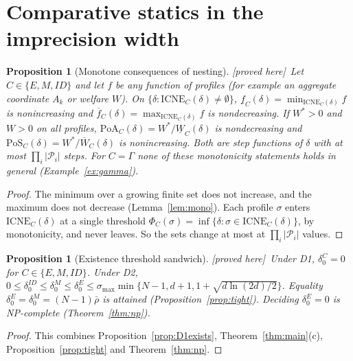 \documentclass[11pt]{article}
\newtheorem{proposition}[theorem]{Proposition}
\theoremstyle{definition}
\theoremstyle{remark}
\newcommand{\cP}{\mathcal{P}}
\newcommand{\ICNE}{\mathrm{ICNE}}
\newcommand{\PROVED}{\textsf{[proved here]}}
\begin{document}
\section{Comparative statics in the imprecision width}\label{sec:cs}

\begin{proposition}[Monotone consequences of nesting]\label{prop:cs} \PROVED\
Let $C\in\{E,M,ID\}$ and let $f$ be any function of profiles (for example an aggregate coordinate $A_k$ or welfare $W$). On $\{\delta:\ICNE_C(\delta)\ne\emptyset\}$, $\underline f_C(\delta)=\min_{\ICNE_C(\delta)}f$ is nonincreasing and $\overline f_C(\delta)=\max_{\ICNE_C(\delta)}f$ is nondecreasing. If $W^*>0$ and $W>0$ on all profiles, $\mathrm{PoA}_C(\delta)=W^*/\underline W_C(\delta)$ is nondecreasing and $\mathrm{PoS}_C(\delta)=W^*/\overline W_C(\delta)$ is nonincreasing. Both are step functions of $\delta$ with at most $\prod_i|\cP_i|$ steps. For $C=\Gamma$ none of these monotonicity statements holds in general (Example~\ref{ex:gamma}).
\end{proposition}
\begin{proof}
The minimum over a growing finite set does not increase, and the maximum does not decrease (Lemma~\ref{lem:mono}). Each profile $\sigma$ enters $\ICNE_C(\delta)$ at a single threshold $\Phi_C(\sigma)=\inf\{\delta:\sigma\in\ICNE_C(\delta)\}$, by monotonicity, and never leaves. So the sets change at most at $\prod_i|\cP_i|$ values.
\end{proof}

\begin{proposition}[Existence threshold sandwich]\label{prop:sandwich} \PROVED\
Under D1, $\delta^C_0=0$ for $C\in\{E,M,ID\}$. Under D2, $0\le\delta_0^{ID}\le\delta_0^M\le\delta_0^E\le\sigma_{\max}\min\{N-1,d+1,1+\sqrt{d\ln(2d)/2}\}$. Equality $\delta_0^E=\delta_0^M=(N-1)\bar\rho$ is attained (Proposition~\ref{prop:tight}). Deciding $\delta^E_0=0$ is NP-complete (Theorem~\ref{thm:np}).
\end{proposition}
\begin{proof}
This combines Proposition~\ref{prop:D1exists}, Theorem~\ref{thm:main}(c), Proposition~\ref{prop:tight} and Theorem~\ref{thm:np}.
\end{proof}
\end{document}
